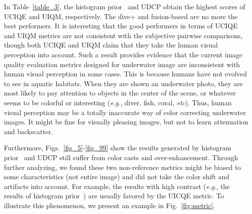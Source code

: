 \documentclass[journal]{IEEEtran}
\newcommand{\eg}{\textit{e}.\textit{g}.}
\newcommand{\etc}{\textit{etc}}
\begin{document}
In Table~\ref{table_3}, the histogram prior~\cite{Li2016} and UDCP \cite{Drews2016} obtain the highest scores of UCIQE and UIQM, respectively. The dive+ and fusion-based \cite{Ancuti2012} are no more the best performers. It is interesting that the good performers in terms of UCIQE and UIQM metrics are not consistent with the subjective pairwise comparisons, though both UCIQE and UIQM claim that they take the human visual perception into account. Such a result provides evidence that the current image quality evaluation metrics designed for underwater image are inconsistent with human visual perception in some cases. This is because humans have not evolved to see in aquatic habitats. When they are shown an underwater photo, they are most likely to pay attention to objects in the center of the scene, or whatever seems to be colorful or interesting (\eg, diver, fish, coral, \etc). Thus, human visual perception may be a totally inaccurate way of color correcting underwater images. It might be fine for visually pleasing images, but not to learn attenuation and backscatter.

Furthermore, Figs.~\ref{fig_5}-\ref{fig_99} show the results generated by histogram prior~\cite{Li2016} and UDCP \cite{Drews2016} still suffer from color casts and over-enhancement. Through further analyzing, we found these two non-reference metrics  might be biased to some characteristics (not entire image) and did not take the color shift and artifacts into account. For example, the results with high contrast (\eg, the results of histogram prior~\cite{Li2016}) are usually favored by the UICQE metric.
To illustrate this phenomenon, we present an example in Fig.~\ref{fig:metric}.
\end{document}
